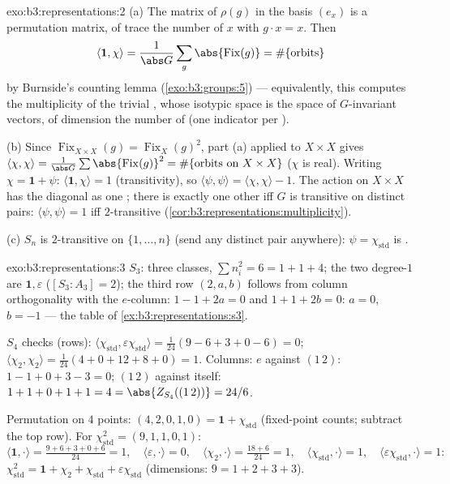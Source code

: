 \begin{solution}{exo:b3:representations:2}
(a) The matrix of $\rho(g)$ in the basis $(e_x)$ is a
permutation matrix, of trace the number of $x$ with $g\cdot x =
x$. Then
\[
\langle\mathbf 1, \chi\rangle = \frac1{\abs G}\sum_g
\abs{\operatorname{Fix}(g)} = \#\{\text{orbits}\}
\]
by Burnside's counting lemma (\cref{exo:b3:groups:5}) ---
equivalently, this computes the multiplicity of the trivial
, whose isotypic space is the space of
$G$-invariant vectors, of dimension the number of  (one
indicator per ).

(b) Since $\operatorname{Fix}_{X\times X}(g) =
\operatorname{Fix}_X(g)^2$, part (a) applied to $X \times X$
gives $\langle\chi,\chi\rangle = \frac1{\abs
G}\sum\abs{\operatorname{Fix}(g)}^2 = \#\{\text{orbits on }
X\times X\}$ ($\chi$ is real). Writing $\chi = \mathbf 1 +
\psi$: $\langle\mathbf1,\chi\rangle = 1$ (transitivity), so
$\langle\psi,\psi\rangle = \langle\chi,\chi\rangle - 1$. The
action on $X\times X$ has the diagonal as one ; there is
exactly one other  iff $G$ is transitive on distinct pairs:
$\langle\psi,\psi\rangle = 1$ iff $2$-transitive
(\cref{cor:b3:representations:multiplicity}).

(c) $S_n$ is $2$-transitive on $\{1,\dots,n\}$ (send any
distinct pair anywhere): $\psi = \chi_{\mathrm{std}}$ is
.
\end{solution}

\begin{solution}{exo:b3:representations:3}
$S_3$: three classes, $\sum n_i^2 = 6 = 1 + 1 + 4$; the two
degree-$1$  are $\mathbf 1, \varepsilon$ ($[S_3 :
A_3] = 2$); the third row $(2, a, b)$ follows from column
orthogonality with the $e$-column: $1 - 1 + 2a = 0$ and $1 + 1 +
2b = 0$: $a = 0$, $b = -1$ --- the table of
\cref{ex:b3:representations:s3}.

$S_4$ checks (rows): $\langle\chi_{\mathrm{std}},
\varepsilon\chi_{\mathrm{std}}\rangle = \frac1{24}(9 - 6 + 3 + 0
- 6) = 0$; $\langle\chi_2,\chi_2\rangle = \frac1{24}(4 + 0 + 12
+ 8 + 0) = 1$. Columns: $e$ against $(1\,2)$: $1 - 1 + 0 + 3 - 3
= 0$; $(1\,2)$ against itself: $1 + 1 + 0 + 1 + 1 = 4 =
\abs{Z_{S_4}((1\,2))} = 24/6$.

Permutation  on $4$ points: $(4, 2, 0, 1, 0) = \mathbf
1 + \chi_{\mathrm{std}}$ (fixed-point counts; subtract the top
row). For $\chi_{\mathrm{std}}^2 = (9, 1, 1, 0, 1)$:
\[
\langle\mathbf1,\cdot\rangle = \tfrac{9 + 6 + 3 + 0 + 6}{24} =
1,\quad
\langle\varepsilon,\cdot\rangle = 0,\quad
\langle\chi_2,\cdot\rangle = \tfrac{18 + 6}{24} = 1,\quad
\langle\chi_{\mathrm{std}},\cdot\rangle = 1,\quad
\langle\varepsilon\chi_{\mathrm{std}},\cdot\rangle = 1:
\]
$\chi_{\mathrm{std}}^2 = \mathbf 1 + \chi_2 +
\chi_{\mathrm{std}} + \varepsilon\chi_{\mathrm{std}}$
(dimensions: $9 = 1 + 2 + 3 + 3$).
\end{solution}

